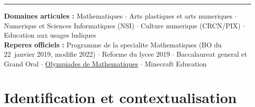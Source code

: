 \documentclass[12pt,a4paper]{scrartcl}
\begin{document}
\begin{titlepage}
  {\color{rule}\rule{0.6\textwidth}{0.6pt}\par}
  \vspace{0.9cm}
  \begin{minipage}{0.82\textwidth}
    \centering\sffamily\small\color{muted}
    \textbf{Domaines articules :} Mathematiques $\cdot$ Arts plastiques et arts numeriques $\cdot$ Numerique et Sciences Informatiques (NSI) $\cdot$ Culture numerique (CRCN/PIX) $\cdot$ Education aux usages ludiques \\[0.4em]
    \textbf{Reperes officiels :} Programme de la specialite Mathematiques (BO du 22~janvier 2019, modifie 2022) $\cdot$ Reforme du lycee 2019 $\cdot$ Baccalaureat general et Grand Oral $\cdot$ \hyperref[sec:olympiades]{Olympiades de Mathematiques} $\cdot$ Minecraft Education
  \end{minipage}
\end{titlepage}

\renewcommand{\contentsname}{\color{accent}Sommaire}
\tableofcontents
\thispagestyle{fancy}
\newpage

\section{Identification et contextualisation}\label{sec:identificacao}
\end{document}
